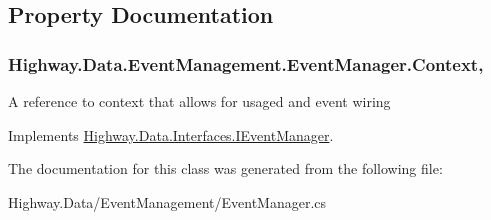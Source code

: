 \subsection{Property Documentation}
\hypertarget{class_highway_1_1_data_1_1_event_management_1_1_event_manager_ac5a9cddf17fcb4c3b298b3d50431de2f}{
\subsubsection[{Context}]{ Highway.\-Data.\-Event\-Management.\-Event\-Manager.\-Context\hspace{0.3cm}{\ttfamily [get]}, {\ttfamily [set]}}}\label{class_highway_1_1_data_1_1_event_management_1_1_event_manager_ac5a9cddf17fcb4c3b298b3d50431de2f}


A reference to context that allows for usaged and event wiring 



Implements \hyperlink{interface_highway_1_1_data_1_1_interfaces_1_1_i_event_manager_aae163759719833dca07513b02efbafa8}{Highway.\-Data.\-Interfaces.\-I\-Event\-Manager}.



The documentation for this class was generated from the following file\-:\begin{DoxyCompactItemize}
\item 
Highway.\-Data/\-Event\-Management/Event\-Manager.\-cs\end{DoxyCompactItemize}

